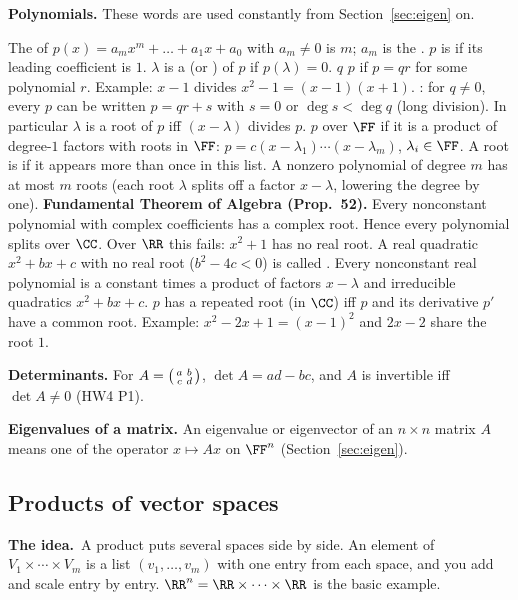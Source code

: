 \documentclass[10pt]{scrartcl}
\newcommand{\idea}{\par\noindent\textbf{\color{MidnightBlue}The idea.}\ }
\begin{document}
\textbf{Polynomials.} These words are used constantly from Section~\ref{sec:eigen} on.
\begin{itemize}
  \ii The  of $p(x)=a_mx^m+\dots+a_1x+a_0$ with $a_m\ne0$ is $m$; $a_m$ is the . $p$ is  if its leading coefficient is $1$.
  \ii $\lambda$ is a  (or ) of $p$ if $p(\lambda)=0$.
  \ii $q$  $p$ if $p=qr$ for some polynomial $r$. Example: $x-1$ divides $x^2-1=(x-1)(x+1)$.
  \ii {}: for $q\ne0$, every $p$ can be written $p=qr+s$ with $s=0$ or $\deg s<\deg q$ (long division). In particular $\lambda$ is a root of $p$ iff $(x-\lambda)$ divides $p$.
  \ii $p$  over $\FF$ if it is a product of degree-$1$ factors with roots in $\FF$: $p=c(x-\lambda_1)\cdots(x-\lambda_m)$, $\lambda_i\in\FF$. A root is  if it appears more than once in this list.
  \ii A nonzero polynomial of degree $m$ has at most $m$ roots (each root $\lambda$ splits off a factor $x-\lambda$, lowering the degree by one).
  \ii \textbf{Fundamental Theorem of Algebra (Prop.~52).} Every nonconstant polynomial with complex coefficients has a complex root. Hence every polynomial splits over $\CC$.
  \ii Over $\RR$ this fails: $x^2+1$ has no real root. A real quadratic $x^2+bx+c$ with no real root ($b^2-4c<0$) is called . Every nonconstant real polynomial is a constant times a product of factors $x-\lambda$ and irreducible quadratics $x^2+bx+c$.
  \ii $p$ has a repeated root (in $\CC$) iff $p$ and its derivative $p'$ have a common root. Example: $x^2-2x+1=(x-1)^2$ and $2x-2$ share the root $1$.
\end{itemize}

\textbf{Determinants.} For $A=\begin{psmallmatrix}a&b\\c&d\end{psmallmatrix}$, $\det A=ad-bc$, and $A$ is invertible iff $\det A\ne0$ (HW4 P1).

\textbf{Eigenvalues of a matrix.} An eigenvalue or eigenvector of an $n\times n$ matrix $A$ means one of the operator $x\mapsto Ax$ on $\FF^n$ (Section~\ref{sec:eigen}).

\subsection{Products of vector spaces}\label{sec:products}
\idea A product puts several spaces side by side. An element of $V_1\times\cdots\times V_m$ is a list $(v_1,\dots,v_m)$ with one entry from each space, and you add and scale entry by entry. $\RR^n=\RR\times\cdots\times\RR$ is the basic example.
\end{document}
